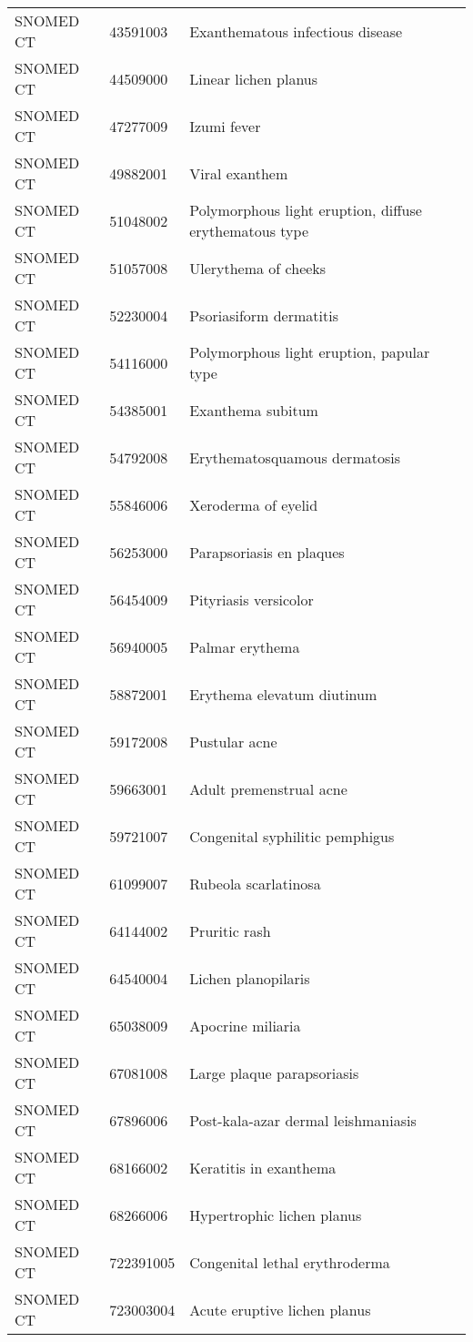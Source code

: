 \begin{longtable}{p{}p{}p{}}
  SNOMED CT & 43591003 & Exanthematous infectious disease \\ 
  SNOMED CT & 44509000 & Linear lichen planus \\ 
  SNOMED CT & 47277009 & Izumi fever \\ 
  SNOMED CT & 49882001 & Viral exanthem \\ 
  SNOMED CT & 51048002 & Polymorphous light eruption, diffuse erythematous type \\ 
  SNOMED CT & 51057008 & Ulerythema of cheeks \\ 
  SNOMED CT & 52230004 & Psoriasiform dermatitis \\ 
  SNOMED CT & 54116000 & Polymorphous light eruption, papular type \\ 
  SNOMED CT & 54385001 & Exanthema subitum \\ 
  SNOMED CT & 54792008 & Erythematosquamous dermatosis \\ 
  SNOMED CT & 55846006 & Xeroderma of eyelid \\ 
  SNOMED CT & 56253000 & Parapsoriasis en plaques \\ 
  SNOMED CT & 56454009 & Pityriasis versicolor \\ 
  SNOMED CT & 56940005 & Palmar erythema \\ 
  SNOMED CT & 58872001 & Erythema elevatum diutinum \\ 
  SNOMED CT & 59172008 & Pustular acne \\ 
  SNOMED CT & 59663001 & Adult premenstrual acne \\ 
  SNOMED CT & 59721007 & Congenital syphilitic pemphigus \\ 
  SNOMED CT & 61099007 & Rubeola scarlatinosa \\ 
  SNOMED CT & 64144002 & Pruritic rash \\ 
  SNOMED CT & 64540004 & Lichen planopilaris \\ 
  SNOMED CT & 65038009 & Apocrine miliaria \\ 
  SNOMED CT & 67081008 & Large plaque parapsoriasis \\ 
  SNOMED CT & 67896006 & Post-kala-azar dermal leishmaniasis \\ 
  SNOMED CT & 68166002 & Keratitis in exanthema \\ 
  SNOMED CT & 68266006 & Hypertrophic lichen planus \\ 
  SNOMED CT & 722391005 & Congenital lethal erythroderma \\ 
  SNOMED CT & 723003004 & Acute eruptive lichen planus \\ 

\end{longtable}
